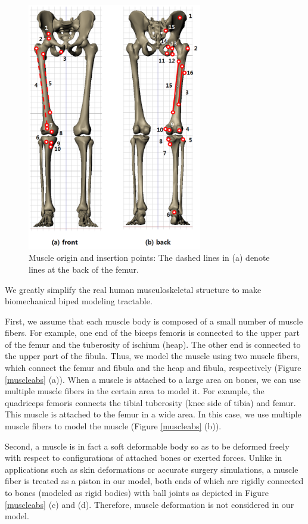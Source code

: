 \documentclass[master,english,final]{kaist-ucs}
\begin{document}
\begin{figure}[h!]
  \centering
  \includegraphics[width=3in]{musclepoints}
  \caption[Muscle origin and insertion points]
  {Muscle origin and insertion points: The dashed lines in (a) denote lines at the back of the femur.}
   \label{fig:musclepoints}
\end{figure}

We greatly simplify the real human musculoskeletal structure to make biomechanical biped modeling tractable.

First, we assume that each muscle body is composed of a small number of muscle fibers.
For example, one end of the biceps femoris is connected to the upper part of
the femur and the tuberosity of ischium (heap).
The other end is connected to the upper part of the fibula. Thus, we model
the muscle using two muscle fibers, which connect the femur and fibula and the heap and fibula,
respectively (Figure \ref{muscleabs} (a)).
When a muscle is attached to a large area on bones, we can use multiple muscle fibers
in the certain area to model it. For example, the quadriceps femoris connects
the tibial tuberosity (knee side of tibia)
and femur. This muscle is attached to the femur in a wide area. In this case,
we use multiple muscle fibers to model the muscle (Figure \ref{muscleabs} (b)).

Second, a muscle is in fact a soft deformable body so as to be deformed freely
with respect to configurations of attached bones or exerted forces. Unlike in applications
such as skin deformations or accurate surgery simulations,
a muscle fiber is treated as a piston in our model, both ends of which are rigidly connected to bones
(modeled as rigid bodies) with ball joints as depicted in Figure \ref{muscleabs} (c) and (d).
Therefore, muscle deformation is not considered in our model.
\end{document}
